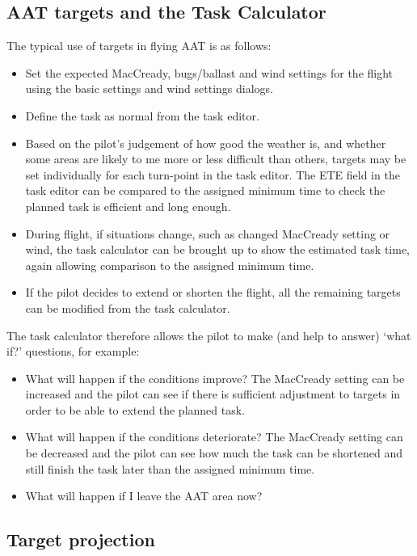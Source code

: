 \documentclass[a4paper,12pt]{refrep}
\begin{document}
\subsection*{AAT targets and the Task Calculator}

The typical use of targets in flying AAT is as follows:
\begin{itemize}
\item Set the expected MacCready, bugs/ballast and wind settings
  for the flight using the basic settings and wind settings dialogs.
\item Define the task as normal from the task editor.
\item Based on the pilot's judgement of how good the weather is,
  and whether some areas are likely to me more or less difficult than
  others, targets may be set individually for each turn-point in the
  task editor.  The ETE field in the task editor can be compared to
  the assigned minimum time to check the planned task is efficient and
  long enough.
\item During flight, if situations change, such as changed MacCready setting
  or wind, the task calculator can be brought up to show the estimated
  task time, again allowing comparison to the assigned minimum time.
\item If the pilot decides to extend or shorten the flight, all the remaining
  targets can be modified from the task calculator. 
\end{itemize}

The task calculator therefore allows the pilot to make (and help to
answer) `what if?' questions, for example:
\begin{itemize}
\item What will happen if the conditions improve?  The MacCready setting can be increased and the pilot can see if there is sufficient adjustment to targets in order to be able to extend the planned task.
\item What will happen if the conditions deteriorate?  The MacCready setting can be decreased and the pilot can see how much the task can be shortened and still finish the task later than the assigned minimum time.
\item What will happen if I leave the AAT area now?
\end{itemize}

\subsection*{Target projection}
\end{document}
